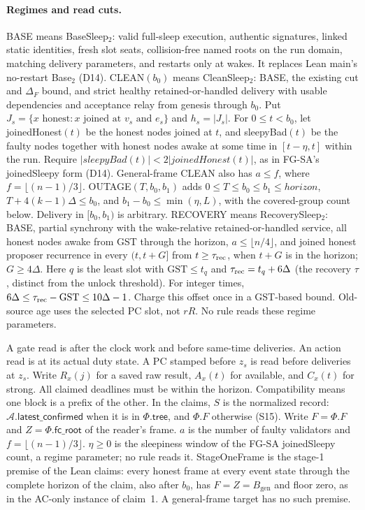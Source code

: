 \documentclass{article}
\newcommand{\genesis}{B_{\mathrm{gen}}}
\newcommand{\AC}{\mathcal A}
\newcommand{\Fr}{\Phi}
\newcommand{\tree}{\mathsf{tree}}
\newcommand{\fcroot}{\mathsf{fc\_root}}
\newcommand{\latestConfirmed}{\mathsf{latest\_confirmed}}
\begin{document}
\paragraph{Regimes and read cuts.}
BASE means BaseSleep$_2$: valid full-sleep execution, authentic signatures,
linked static identities, fresh slot seats, collision-free named roots on
the run domain, matching delivery parameters, and restarts only at wakes.
It replaces Lean main's no-restart Base$_2$ (D14).
CLEAN$(b_0)$ means CleanSleep$_2$: BASE, the existing cut and $\Delta_F$
bound, and strict healthy retained-or-handled delivery with usable
dependencies and acceptance relay from genesis through $b_0$.
Put $J_s=\{x\text{ honest}:x\text{ joined at }v_s\text{ and }e_s\}$
and $h_s=|J_s|$. For $0\leq t<b_0$, let joinedHonest$(t)$ be the honest
nodes joined at $t$, and sleepyBad$(t)$ be the faulty nodes together with
honest nodes awake at some time in $[t-\eta,t]$ within the run. Require
$|\mathit{sleepyBad}(t)|<2|\mathit{joinedHonest}(t)|$, as in FG-SA's
joinedSleepy form (D14). General-frame CLEAN also has $a\leq f$, where
$f=\lfloor(n-1)/3\rfloor$.
OUTAGE$(T,b_0,b_1)$ adds $0\leq T\leq b_0\leq b_1\leq\mathit{horizon}$,
$T+4(k-1)\Delta\leq b_0$, and $b_1-b_0\leq\min(\eta,L)$,
with the covered-group count below. Delivery in $[b_0,b_1)$ is arbitrary.
RECOVERY means RecoverySleep$_2$: BASE, partial synchrony with the
wake-relative retained-or-handled service, all honest nodes awake from
GST through the horizon, $a\leq\lfloor n/4\rfloor$, and joined honest
proposer recurrence in every $(t,t+G]$ from $t\geq\tau_{\rm rec}$,
when $t+G$ is in the horizon; $G\geq4\Delta$.
Here $q$ is the least slot with $\mathrm{GST}\leq t_q$ and
$\tau_{\rm rec}=t_q+6\Delta$ (the recovery $\tau$, distinct from the
unlock threshold). For integer times,
$6\Delta\leq\tau_{\rm rec}-\mathrm{GST}\leq10\Delta-1$.
Charge this offset once in a GST-based bound. Old-source age uses the
selected PC slot, not $rR$. No rule reads these regime parameters.

A gate read is after the clock work and before same-time deliveries.
An action read is at its actual duty state. A PC stamped before $z_s$
is read before deliveries at $z_s$.
Write $R_x(j)$ for a saved raw result, $A_x(t)$ for available, and
$C_x(t)$ for strong. All claimed deadlines must be within the horizon.
Compatibility means one block is a prefix of the other.
In the claims, $S$ is the normalized record: $\AC.\latestConfirmed$ when it
is in $\Fr.\tree$, and $\Fr.F$ otherwise (S15).
Write $F=\Fr.F$ and $Z=\Fr.\fcroot$ of the reader's frame.  $a$ is the
number of faulty validators and $f=\lfloor(n-1)/3\rfloor$.  $\eta\geq0$ is
the sleepiness window of the FG-SA joinedSleepy count, a regime parameter;
no rule reads it.  StageOneFrame is the stage-1 premise of the Lean claims:
every honest frame at every event state through the complete horizon of
the claim, also after $b_0$, has $F=Z=\genesis$ and
floor zero, as in the AC-only instance of claim~1.  A general-frame target
has no such premise.
\end{document}
